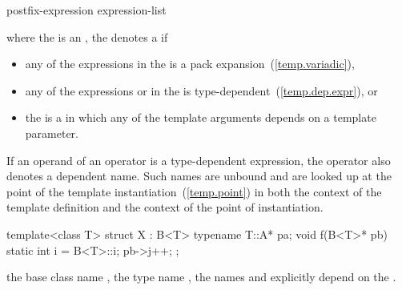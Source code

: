 \begin{ncbnftab}
postfix-expression \terminal{(} expression-list\opt{} \terminal{)}
\end{ncbnftab}

where the
is an
,
the
denotes a
if

\begin{itemize}
\item
any of the expressions in the  is a pack
expansion~(\ref{temp.variadic}),

\item
any of the expressions
or 
in the
is type-dependent~(\ref{temp.dep.expr}), or

\item
the 
is a  in which any of the template arguments depends
on a template parameter.
\end{itemize}

If an operand of an operator is a type-dependent expression, the operator
also denotes a dependent name.
Such names are unbound and
are looked up at the point of the template instantiation~(\ref{temp.point}) in
both the context of the template definition and the
context of the point of instantiation.

\pnum
\begin{example}
\begin{codeblock}
template<class T> struct X : B<T> {
  typename T::A* pa;
  void f(B<T>* pb) {
    static int i = B<T>::i;
    pb->j++;
  }
};
\end{codeblock}

the base class name
,
the type name
,
the names
and
explicitly depend on the
.
\end{example}

